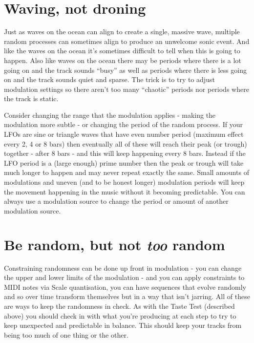 \documentclass[
  12pt,
  letterpaper,
  oneside,
  open=any]{scrbook}
\begin{document}
\section{Waving, not droning}\label{waving-not-droning}

Just as waves on the ocean can align to create a single, massive wave,
multiple random processes can sometimes align to produce an unwelcome
sonic event. And like the waves on the ocean it's sometimes difficult to
tell when this is going to happen. Also like waves on the ocean there
may be periods where there is a lot going on and the track sounds
``busy'' as well as periods where there is less going on and the track
sounds quiet and sparse. The trick is to try to adjust modulation
settings so there aren't too many ``chaotic'' periods nor periods where
the track is static.

Consider changing the range that the modulation applies - making the
modulation more subtle - or changing the period of the random process.
If your LFOs are sine or triangle waves that have even number period
(maximum effect every 2, 4 or 8 bars) then eventually all of these will
reach their peak (or trough) together - after 8 bars - and this will
keep happening every 8 bars. Instead if the LFO period is a (large
enough) prime number then the peak or trough will take much longer to
happen and may never repeat exactly the same. Small amounts of
modulations and uneven (and to be honest longer) modulation periods will
keep the movement happening in the music without it becoming
predictable. You can always use a modulation source to change the period
or amount of another modulation source.

\section{\texorpdfstring{Be random, but not \textbf{\emph{too}}
random}{Be random, but not too random}}\label{be-random-but-not-too-random}

Constraining randomness can be done up front in modulation - you can
change the upper and lower limits of the modulation - and you can apply
constraints to MIDI notes via Scale quantisation, you can have sequences
that evolve randomly and so over time transform themselves but in a way
that isn't jarring. All of these are ways to keep the randomness in
check. As with the Taste Test (described above) you should check in with
what you're producing at each step to try to keep unexpected and
predictable in balance. This should keep your tracks from being too much
of one thing or the other.
\end{document}
